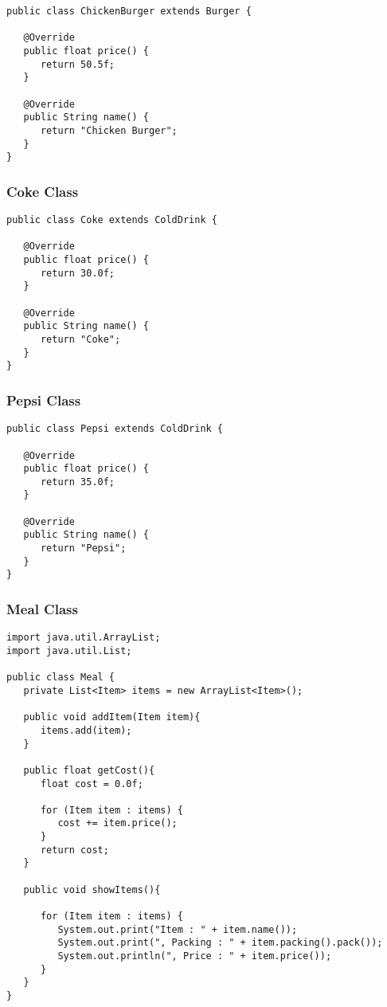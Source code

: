 \begin{verbatim}
public class ChickenBurger extends Burger {

   @Override
   public float price() {
      return 50.5f;
   }

   @Override
   public String name() {
      return "Chicken Burger";
   }
}
\end{verbatim}

\subsubsection{Coke Class}

\begin{verbatim}
public class Coke extends ColdDrink {

   @Override
   public float price() {
      return 30.0f;
   }

   @Override
   public String name() {
      return "Coke";
   }
}
\end{verbatim}

\subsubsection{Pepsi Class}

\begin{verbatim}
public class Pepsi extends ColdDrink {

   @Override
   public float price() {
      return 35.0f;
   }

   @Override
   public String name() {
      return "Pepsi";
   }
}
\end{verbatim}

\subsubsection{Meal Class}

\begin{verbatim}
import java.util.ArrayList;
import java.util.List;

public class Meal {
   private List<Item> items = new ArrayList<Item>();	

   public void addItem(Item item){
      items.add(item);
   }

   public float getCost(){
      float cost = 0.0f;
      
      for (Item item : items) {
         cost += item.price();
      }		
      return cost;
   }

   public void showItems(){
   
      for (Item item : items) {
         System.out.print("Item : " + item.name());
         System.out.print(", Packing : " + item.packing().pack());
         System.out.println(", Price : " + item.price());
      }		
   }	
}
\end{verbatim}

